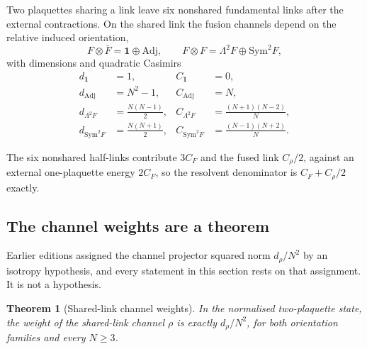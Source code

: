 \documentclass[11pt]{article}
\theoremstyle{plain}
\newtheorem{theorem}{Theorem}
\theoremstyle{definition}
\theoremstyle{remark}
\newcommand{\chk}[1]{}
\newcommand{\CF}{C_F}
\begin{document}
Two plaquettes sharing a link leave six nonshared fundamental links after the
external contractions. On the shared link the fusion channels depend on the
relative induced orientation,
\begin{equation}\label{eq:fusion}
  F\otimes\bar F=\mathbf{1}\oplus\mathrm{Adj},
  \qquad
  F\otimes F=\Lambda^2F\oplus\mathrm{Sym}^2F ,
\end{equation}
with dimensions and quadratic Casimirs
\begin{equation}\label{eq:table}
\begin{aligned}
  d_{\mathbf 1}&=1, & C_{\mathbf 1}&=0,\\
  d_{\mathrm{Adj}}&=N^2-1, & C_{\mathrm{Adj}}&=N,\\
  d_{\Lambda^2F}&=\tfrac{N(N-1)}2, & C_{\Lambda^2F}&=\tfrac{(N+1)(N-2)}N,\\
  d_{\mathrm{Sym}^2F}&=\tfrac{N(N+1)}2, & C_{\mathrm{Sym}^2F}&=\tfrac{(N-1)(N+2)}N.
\end{aligned}
\end{equation}

The six nonshared half-links contribute $3\CF$ and the fused link $C_\rho/2$,
against an external one-plaquette energy $2\CF$, so the resolvent denominator
is $\CF+C_\rho/2$ exactly.
\chk{each channel gap is C\_F + C\_R/2, and the weights sum to one}

\subsection{The channel weights are a theorem}

Earlier editions assigned the channel projector squared norm $d_\rho/N^2$ by
an isotropy hypothesis, and every statement in this section rests on that
assignment. It is not a hypothesis.

\begin{theorem}[Shared-link channel weights]\label{thm:weingarten}
In the normalised two-plaquette state, the weight of the shared-link channel
$\rho$ is exactly $d_\rho/N^2$, for both orientation families and every
$N\ge3$.
\end{theorem}
\end{document}
